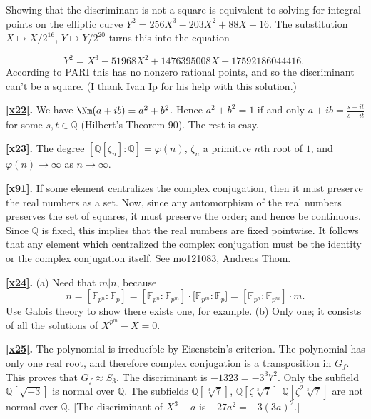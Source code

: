 \documentclass[a4paper,11pt,final,openany]{memoir}
\theoremstyle{nonumberplain}
\begin{document}
Showing that the discriminant is not a square is equivalent to solving for
integral points on the elliptic curve $Y^{2}=256X^{3}-203X^{2}+88X-16$. The
substitution $X\mapsto X/2^{16}$, $Y\mapsto Y/2^{20}$ turns this into the equation%

\[
Y^{2}=X^{3}-51968X^{2}+1476395008X-17592186044416\text{. }%
\]
According to PARI this has no nonzero rational points, and so the discriminant
can't be a square. (I thank Ivan Ip for his help with this solution.)

\medskip\noindent\textbf{\ref{x22}.} We have $\Nm(a+ib)=a^{2}+b^{2}$. Hence
$a^{2}+b^{2}=1$ if and only $a+ib=\frac{s+it}{s-it}$ for some $s,t\in
{\mathbb{Q}}$ (Hilbert's Theorem 90). The rest is easy.

\medskip\noindent\textbf{\ref{x23}.} The degree $[{\mathbb{Q}}[\zeta
_{n}]\colon{\mathbb{Q}}]=\varphi(n)$, $\zeta_{n}$ a primitive $n$th root of
$1$, and $\varphi(n)\rightarrow\infty$ as $n\rightarrow\infty$.

\medskip\noindent\textbf{\ref{x91}.} If some element centralizes the complex
conjugation, then it must preserve the real numbers as a set. Now, since any
automorphism of the real numbers preserves the set of squares, it must
preserve the order; and hence be continuous. Since $\mathbb{Q}$ is fixed, this
implies that the real numbers are fixed pointwise. It follows that any element
which centralized the complex conjugation must be the identity or the complex
conjugation itself. See mo121083, Andreas Thom.

\medskip\noindent\textbf{\ref{x24}.} (a) Need that $m|n$, because
\[
n=[\mathbb{F}{}_{p^{n}}\colon\mathbb{F}{}_{p}]=[\mathbb{F}{}_{p^{n}}%
\colon\mathbb{F}{}_{p^{m}}]\cdot\lbrack\mathbb{F}{}_{p^{m}}\colon\mathbb{F}%
{}_{p}]=[\mathbb{F}{}_{p^{n}}\colon\mathbb{F}{}_{p^{m}}]\cdot m.
\]
Use Galois theory to show there exists one, for example. (b) Only one; it
consists of all the solutions of $X^{p^{m}}-X=0$.

\medskip\noindent\textbf{\ref{x25}.} The polynomial is irreducible by
Eisenstein's criterion. The polynomial has only one real root, and therefore
complex conjugation is a transposition in $G_{f}$. This proves that
$G_{f}\approx S_{3}$. The discriminant is $-1323=-3^{3}7^{2}$. Only the
subfield ${\mathbb{Q}}[\sqrt{-3}]$ is normal over ${\mathbb{Q}}$. The
subfields ${\mathbb{Q}}[\sqrt[3]{7}]$, ${\mathbb{Q}}[\zeta\sqrt[3]{7}]$
${\mathbb{Q}}[\zeta^{2}\sqrt[3]{7}]$ are not normal over ${\mathbb{Q}}$. [The
discriminant of $X^{3}-a$ is $-27a^{2}=-3(3a)^{2}$.]
\end{document}
